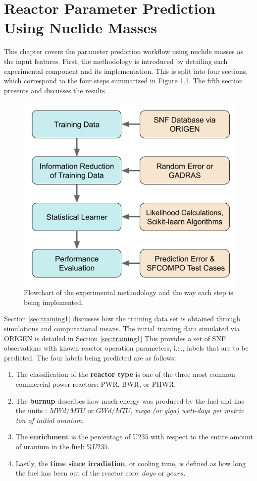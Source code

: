 
\glsresetall

\chapter{Reactor Parameter Prediction Using Nuclide Masses}
\label{ch:exp1}

This chapter covers the parameter prediction workflow using nuclide masses as
the input features. First, the methodology is introduced by detailing each
experimental component and its implementation.  This is split into four
sections, which correspond to the four steps summarized in Figure
\ref{fig:method}. The fifth section presents and discusses the results.

\begin{figure}[!ht]
  \centering
  \includegraphics[width=0.7\linewidth]{./chapters/exp1/methodology.png}
  \caption{Flowchart of the experimental methodology and the way each step is being implemented.}
  \label{fig:method}
\end{figure}

Section \ref{sec:training1} discusses how the training data set is obtained
through simulations and computational means. The initial training data
simulated via \gls{ORIGEN} is detailed in Section \ref{sec:training1} This
provides a set of \gls{SNF} observations with known reactor operation
parameters, i.e., labels that are to be predicted. The four labels being
predicted are as follows:
\begin{enumerate}
  \item The classification of the \textbf{reactor type} is one of the three
  most common commercial power reactors: \gls{PWR}, \gls{BWR}, or \gls{PHWR}.
  \item The \textbf{burnup} describes how much energy was produced by the fuel
  and has the units : $MWd/MTU$ or $GWd/MTU$, \textit{mega (or giga) watt-days
  per metric ton of initial uranium}.
  \item The \textbf{enrichment} is the percentage of \gls{U235} with respect to
  the entire amount of uranium in the fuel: $\%U235$. 
  \item Lastly, the \textbf{time since irradiation}, or cooling time, is
  defined as how long the fuel has been out of the reactor core: $days$ or
  $years$.
\end{enumerate}

